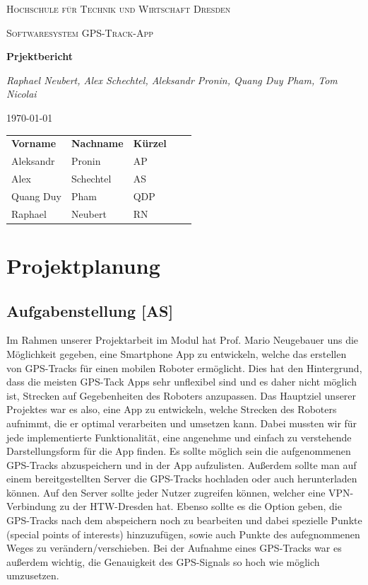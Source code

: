 \documentclass[10pt]{article}
\begin{document}
\begin{titlepage}
    \centering
    {\scshape\LARGE Hochschule für Technik und Wirtschaft Dresden \par}
    \vspace{1cm}
    {\scshape\Large Softwaresystem \glqq GPS-Track-App\grqq\par}
    \vspace{1.5cm}
    {\huge\bfseries Prjektbericht\par}
    \vspace{2cm}
    {\Large\itshape Raphael Neubert, Alex Schechtel, Aleksandr Pronin, Quang Duy Pham, Tom Nicolai\par}
    \vfill

    {\large \today\par}
\end{titlepage}
\tableofcontents
\newpage
\begin{table}[H]
    \begin{tabular}{lllll}
    \textbf{Vorname} & \textbf{Nachname} & \textbf{Kürzel} &  &  \\
    Aleksandr        & Pronin            & AP              &  &  \\
    Alex             & Schechtel         & AS              &  &  \\
    Quang Duy        & Pham              & QDP             &  &  \\
    Raphael          & Neubert           & RN              &  & 
    \end{tabular}
\end{table}
\section{Projektplanung}
\subsection{Aufgabenstellung [AS]}
    Im Rahmen unserer Projektarbeit im Modul  hat Prof. Mario Neugebauer uns die Möglichkeit gegeben,
    eine Smartphone App zu entwickeln, welche das erstellen von GPS-Tracks für einen mobilen 
    Roboter ermöglicht. Dies hat den Hintergrund, dass die meisten GPS-Tack Apps sehr unflexibel sind und es daher nicht 
    möglich ist, Strecken auf Gegebenheiten des Roboters anzupassen. Das Hauptziel unserer Projektes war es also, eine App zu entwickeln, 
    welche Strecken des Roboters aufnimmt, die er optimal verarbeiten und umsetzen kann.
    Dabei mussten wir für jede implementierte Funktionalität,
    eine angenehme und einfach zu verstehende Darstellungsform für die App finden.
    Es sollte möglich sein die aufgenommenen GPS-Tracks abzuspeichern und in der App aufzulisten.
    Außerdem sollte man auf einem bereitgestellten Server die GPS-Tracks hochladen oder auch herunterladen können.
    Auf den Server sollte jeder Nutzer zugreifen können, welcher eine VPN-Verbindung zu der HTW-Dresden hat.
    Ebenso sollte es die Option geben, die GPS-Tracks nach dem abspeichern noch zu bearbeiten und dabei spezielle Punkte (special points of interests) 
    hinzuzufügen, sowie auch Punkte des aufegnommenen Weges zu verändern/verschieben.
    Bei der Aufnahme eines GPS-Tracks war es außerdem wichtig, die Genauigkeit des GPS-Signals so hoch wie möglich umzusetzen. 
\end{document}
